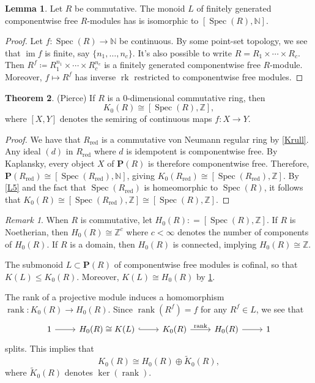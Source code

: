 \documentclass[10pt,letterpaper,cm]{nupset}
\theoremstyle{definition}
\theoremstyle{theorem}
\newtheorem{theorem}{Theorem}
\newtheorem{lemma}[theorem]{Lemma}
\theoremstyle{remark}
\newtheorem{remark}{Remark}
\newcommand{\N}{\mathbb N}
\renewcommand{\P}{\mathbf P}
\newcommand{\Z}{\mathbb Z}
\newcommand{\1}{\mathbf{1}}
\newcommand{\0}{\vec 0}
\DeclareMathOperator{\im}{im}
\DeclareMathOperator{\red}{red}
\DeclareMathOperator{\spec}{Spec}
\DeclareMathOperator{\rank}{rank}
\DeclareMathOperator{\rk}{rk}
\begin{document}
\begin{lemma}\label{L6}
Let $R$ be commutative. The monoid $L$ of finitely generated componentwise free $R$-modules has is isomorphic to $[\spec(R), \N]$.
\end{lemma}
\begin{proof}
Let $f: \spec(R) \to \N$ be continuous. By some point-set topology, we see that $\im f$ is finite, say $\{n_1, \ldots, n_c\}$. It's also possible to write $R= R_1 \times \cdots \times R_c$. Then $R^f \coloneqq R_1^{n_1} \times \cdots \times R_c^{n_c}$ is a finitely generated componentwise free $R$-module. Moreover, $f \mapsto R^f$ has inverse $\rk$ restricted to componentwise free modules.
\end{proof}


\begin{theorem}{(Pierce)}
If $R$ is a $0$-dimensional commutative ring, then $$K_0(R) \cong [\spec(R), \Z],$$ where $[X, Y]$ denotes the semiring of continuous maps $f: X\to Y$.
\end{theorem}
\begin{proof}
We have that $R_{\red}$ is a commutative von Neumann regular ring by \cref{Krull}. Any ideal $(d)$ in $R_{\red}$  where $d$ is idempotent is componentwise free. By Kaplansky, every object $X$ of $\P(R)$ is therefore componentwise free. Therefore, $\P(R_{\red}) \cong [\spec(R_{\red}), \N]$, giving $K_0(R_{\red}) \cong [\spec(R_{\red}), \Z]$. By \cref{L5} and the fact that $\spec(R_{\red})$ is homeomorphic to $\spec(R)$, it follows that $K_0(R)\cong [\spec(R_{\red}), \Z] \cong [\spec(R), \Z]$.
\end{proof}

\begin{remark}
When $R$ is commutative, let $H_0(R): = [\spec(R), \Z]$. If $R$ is Noetherian, then $H_0(R) \cong \Z^c$ where $c <\infty$ denotes the number of components of $H_0(R)$. If $R$ is a domain, then $H_0(R)$ is connected, implying $H_0(R) \cong \Z$.

The submonoid $L\subset \P(R)$ of componentwise free modules is cofinal, so that $K(L) \leq K_0(R)$. Moreover, $K(L) \cong H_0(R)$ by \cref{L6}.

The rank of a projective module induces a homomorphism $\rank: K_0(R) \to H_0(R)$. Since $\rank(R^f) = f$ for any $R^f \in L$, we see that
\[
\begin{tikzcd}
1 \arrow[r] & H_0(R) \cong K(L) \arrow[r, hook] & K_0(R) \arrow[r, "\rank"] & H_0(R) \arrow[r] & 1
\end{tikzcd}
\]
splits. This implies that $$K_0(R) \cong H_0(R) \oplus \widetilde{K}_0(R),$$ where $\widetilde{K}_0(R)$ denotes $\ker(\rank)$.
\end{remark}
\end{document}

